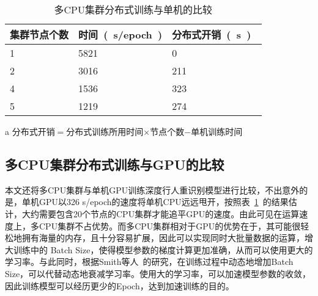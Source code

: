 \begin{table}[!ht]
    \centering
    \caption{多CPU集群分布式训练与单机的比较}
    \label{tab:comp1}
    \begin{threeparttable}
    \begin{tabularx}{\textwidth}{X<{\centering}X<{\centering}X<{\centering}}
    \toprule
    集群节点个数 & 时间~(~s/epoch~) & 分布式开销~(~s~)~\tnote{a} \\ \midrule
    1 & 5821 & 0   \\
    2 & 3016 & 211 \\
    4 & 1536 & 323 \\
    5 & 1219 & 274 \\ \bottomrule
    \end{tabularx}
    \begin{tablenotes}
        \footnotesize
        \item[a] 分布式开销$=$分布式训练所用时间$\times$节点个数$-$单机训练时间
    \end{tablenotes}
    \end{threeparttable}
\end{table}

\subsection{多CPU集群分布式训练与GPU的比较}

本文还将多CPU集群与单机GPU训练深度行人重识别模型进行比较，不出意外的是，单机GPU以326 s/epoch的速度将单机CPU远远甩开，按照表~\ref{tab:comp1}~的结果估计，大约需要包含20个节点的CPU集群才能追平GPU的速度。由此可见在运算速度上，多CPU集群不占优势。而多CPU集群相对于GPU的优势在于，其可能很轻松地拥有海量的内存，且十分容易扩展，因此可以实现同时大批量数据的运算，增大训练中的 Batch Size，使得模型参数的梯度计算更加准确，从而可以使用更大的学习率。与此同时，根据Smith等人~\cite{smith2017don}的研究，在训练过程中动态地增加Batch Size，可以代替动态地衰减学习率。使用大的学习率，可以加速模型参数的收敛，因此训练模型可以经历更少的Epoch，达到加速训练的目的。


